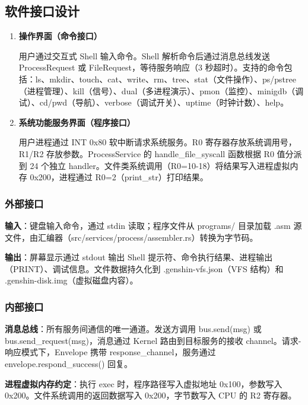 \documentclass[UTF8,a4paper,12pt]{ctexart}
\begin{document}
\subsection{软件接口设计}

\begin{enumerate}[label=(\arabic*)]
    \item \textbf{操作界面（命令接口）}
    
    用户通过交互式 Shell 输入命令。Shell 解析命令后通过消息总线发送 ProcessRequest 或 FileRequest，等待服务响应（3 秒超时）。支持的命令包括：ls、mkdir、touch、cat、write、rm、tree、stat（文件操作）、ps/pstree（进程管理）、kill（信号）、dual（多进程演示）、pmon（监控）、minigdb（调试）、cd/pwd（导航）、verbose（调试开关）、uptime（时钟计数）、help。

    \item \textbf{系统功能服务界面（程序接口）}
    
    用户进程通过 INT 0x80 软中断请求系统服务。R0 寄存器存放系统调用号，R1/R2 存放参数。ProcessService 的 handle\_file\_syscall 函数根据 R0 值分派到 24 个独立 handler。文件类系统调用（R0=10-18）将结果写入进程虚拟内存 0x200，进程通过 R0=2（print\_str）打印结果。
\end{enumerate}

\subsubsection{外部接口}

\textbf{输入}：键盘输入命令，通过 stdin 读取；程序文件从 programs/ 目录加载 .asm 源文件，由汇编器（src/services/process/assembler.rs）转换为字节码。

\textbf{输出}：屏幕显示通过 stdout 输出 Shell 提示符、命令执行结果、进程输出（PRINT）、调试信息。文件数据持久化到 .genshin-vfs.json（VFS 结构）和 .genshin-disk.img（虚拟磁盘内容）。

\subsubsection{内部接口}

\textbf{消息总线}：所有服务间通信的唯一通道。发送方调用 bus.send(msg) 或 bus.send\_request(msg)，消息通过 Kernel 路由到目标服务的接收 channel。请求-响应模式下，Envelope 携带 response\_channel，服务通过 envelope.respond\_success() 回复。

\textbf{进程虚拟内存约定}：执行 exec 时，程序路径写入虚拟地址 0x100，参数写入 0x200。文件系统调用的返回数据写入 0x200，字节数写入 CPU 的 R2 寄存器。
\end{document}

